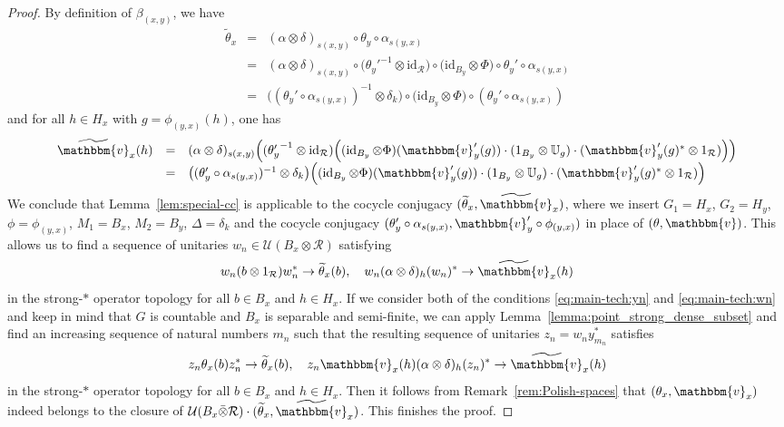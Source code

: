 \documentclass[11pt,a4paper]{article}
\theoremstyle{definition}
\theoremstyle{remark}
\numberwithin{equation}{section}
\numberwithin{theorem}{section}
\renewcommand{\tilde}{\widetilde}
\begin{document}
\begin{proof}
By definition of $\beta_{(x,y)}$, we have
\[
\begin{array}{ccl}
\tilde{\theta}_x &=& (\alpha \otimes \delta)_{s(x,y)} \circ \theta_y \circ \alpha_{s(y,x)} \\
&=&  (\alpha \otimes \delta)_{s(x,y)} \circ \big( {\theta_y'}^{-1} \otimes \mathrm{id}_\mathcal{R} \big) \circ \big( \mathrm{id}_{B_y} \otimes \Phi \big) \circ \theta_y' \circ \alpha_{s(y,x)} \\
&=& \big( ({\theta_y'}\circ\alpha_{s(y,x)})^{-1} \otimes \delta_k \big) \circ \big( \mathrm{id}_{B_y} \otimes \Phi \big) \circ (\theta_y' \circ \alpha_{s(y,x)})
\end{array}
\]
and for all $h\in H_x$ with $g=\phi_{(y,x)}(h)$, one has
\[
\begin{array}{ccl}
\tilde{\mathbbm{v}}_x(h) 
&=& (\alpha \otimes \delta)_{s(x,y)}\Big( ({\theta_y'}^{-1}\otimes\operatorname{id}_{\mathcal R})\Big( (\operatorname{id}_{B_y}\otimes\Phi)(\mathbbm{v}_y'(g)) \cdot (1_{B_y}\otimes \mathbb{U}_g)\cdot (\mathbbm{v}_y'(g)^* \otimes1_{\mathcal R}) \Big) \Big) \\
&=& \big( ({\theta_y'}\circ\alpha_{s(y,x)})^{-1}\otimes\delta_k \big)\Big( (\operatorname{id}_{B_y}\otimes\Phi)(\mathbbm{v}_y'(g)) \cdot (1_{B_y}\otimes \mathbb{U}_g)\cdot (\mathbbm{v}_y'(g)^* \otimes1_{\mathcal R}) \Big)
\end{array}
\]
We conclude that Lemma~\ref{lem:special-cc} is applicable to the cocycle conjugacy $(\tilde{\theta}_x,\tilde{\mathbbm{v}}_x)$, where we insert $G_1=H_x$, $G_2=H_y$, $\phi=\phi_{(y,x)}$, $M_1=B_x$, $M_2=B_y$, $\Delta=\delta_k$ and the cocycle conjugacy $(\theta'_y\circ\alpha_{s(y,x)}, \mathbbm{v}'_y\circ\phi_{(y,x)})$ in place of $(\theta,\mathbbm{v})$.
This allows us to find a sequence of unitaries $w_n\in\mathcal{U}(B_x\otimes\mathcal R)$ satisfying
\begin{equation} \label{eq:main-tech:wn}
w_n(b\otimes 1_{\mathcal R})w_n^* \to \tilde{\theta}_x(b),\quad w_n(\alpha\otimes\delta)_h(w_n)^* \to \tilde{\mathbbm{v}}_x(h)
\end{equation}
in the strong-$*$ operator topology for all $b\in B_x$ and $h\in H_x$.
If we consider both of the conditions \eqref{eq:main-tech:yn} and \eqref{eq:main-tech:wn} and keep in mind that $G$ is countable and $B_x$ is separable and semi-finite, we can apply Lemma~\ref{lemma:point_strong_dense_subset} and find an increasing sequence of natural numbers $m_n$ such that the resulting sequence of unitaries $z_n=w_ny_{m_n}^*$ satisfies
\[
z_n\theta_x(b)z_n^* \to \tilde{\theta}_x(b),\quad z_n\mathbbm{v}_x(h)(\alpha\otimes\delta)_h(z_n)^* \to \tilde{\mathbbm{v}}_x(h)
\]
in the strong-$*$ operator topology for all $b\in B_x$ and $h\in H_x$.
Then it follows from Remark~\ref{rem:Polish-spaces} that $(\theta_x, \mathbbm{v}_x)$ indeed belongs to the closure of $\mathcal{U}(B_x \bar{\otimes}\mathcal{R})\cdot (\tilde{\theta}_x, \tilde{\mathbbm{v}}_x)$.
This finishes the proof.
\end{proof}
\end{document}
